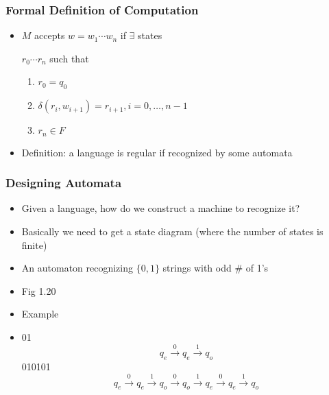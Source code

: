\begin{frame}[allowframebreaks] \frametitle{Formal Definition of Computation}
  \begin{itemize}
\item $M$ accepts $w=w_1 \cdots w_n$ if $\exists$ states

 $r_0 \cdots r_n$ such that
  \begin{enumerate}
  \item $r_0 = q_0$
  \item $\delta(r_i, w_{i+1})= r_{i+1}, i = 0, \ldots, n-1$
  \item $r_n \in F$
  \end{enumerate}
\item \alert{Definition}:
  a language is regular if recognized by some automata
\end{itemize}\end{frame} \begin{frame}[allowframebreaks] \frametitle{Designing Automata}
  \begin{itemize}
\item Given a language, how do we construct a machine to recognize it?
\item Basically we need to get a state diagram (where the number
  of states is finite)
\item An automaton recognizing $\{0,1\}$ strings with odd
\# of 1's 

\item []Fig 1.20

\begin{center}
    \end{center}
\item Example

\item [] 01
  \begin{equation*}
    q_e \xrightarrow{0} q_e \xrightarrow{1} q_o
  \end{equation*}
  010101
  \begin{equation*}
    q_e \xrightarrow{0} q_e \xrightarrow{1} q_o
    \xrightarrow{0} q_o \xrightarrow{1} q_e \xrightarrow{0} q_e
    \xrightarrow{1} q_o
  \end{equation*}
  

\end{itemize}
\end{frame}
